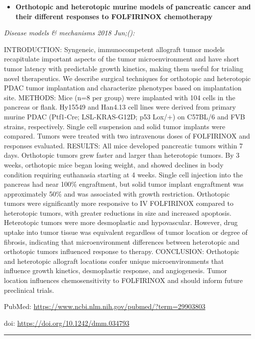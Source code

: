\documentclass[]{article}
\providecommand{\tightlist}{%
  \setlength{\itemsep}{0pt}\setlength{\parskip}{0pt}}
\begin{document}
\begin{itemize}
\tightlist
\item
  \textbf{Orthotopic and heterotopic murine models of pancreatic cancer
  and their different responses to FOLFIRINOX chemotherapy}
\end{itemize}

\emph{Disease models \& mechanisms 2018 Jun;():}

INTRODUCTION: Syngeneic, immunocompetent allograft tumor models
recapitulate important aspects of the tumor microenvironment and have
short tumor latency with predictable growth kinetics, making them useful
for trialing novel therapeutics. We describe surgical techniques for
orthotopic and heterotopic PDAC tumor implantation and characterize
phenotypes based on implantation site. METHODS: Mice (n=8 per group)
were implanted with 104 cells in the pancreas or flank. Hy15549 and
Han4.13 cell lines were derived from primary murine PDAC (Ptf1-Cre;
LSL-KRAS-G12D; p53 Lox/+) on C57BL/6 and FVB strains, respectively.
Single cell suspension and solid tumor implants were compared. Tumors
were treated with two intravenous doses of FOLFIRINOX and responses
evaluated. RESULTS: All mice developed pancreatic tumors within 7 days.
Orthotopic tumors grew faster and larger than heterotopic tumors. By 3
weeks, orthotopic mice began losing weight, and showed declines in body
condition requiring euthanasia starting at 4 weeks. Single cell
injection into the pancreas had near 100\% engraftment, but solid tumor
implant engraftment was approximately 50\% and was associated with
growth restriction. Orthotopic tumors were significantly more responsive
to IV FOLFIRINOX compared to heterotopic tumors, with greater reductions
in size and increased apoptosis. Heterotopic tumors were more
desmoplastic and hypovascular. However, drug uptake into tumor tissue
was equivalent regardless of tumor location or degree of fibrosis,
indicating that microenvironment differences between heterotopic and
orthotopic tumors influenced response to therapy. CONCLUSION: Orthotopic
and heterotopic allograft locations confer unique microenvironments that
influence growth kinetics, desmoplastic response, and angiogenesis.
Tumor location influences chemosensitivity to FOLFIRINOX and should
inform future preclinical trials.

PubMed: \url{https://www.ncbi.nlm.nih.gov/pubmed/?term=29903803}

doi: \url{https://doi.org/10.1242/dmm.034793}

{}

{}

\begin{center}\rule{0.5\linewidth}{\linethickness}\end{center}
\end{document}
